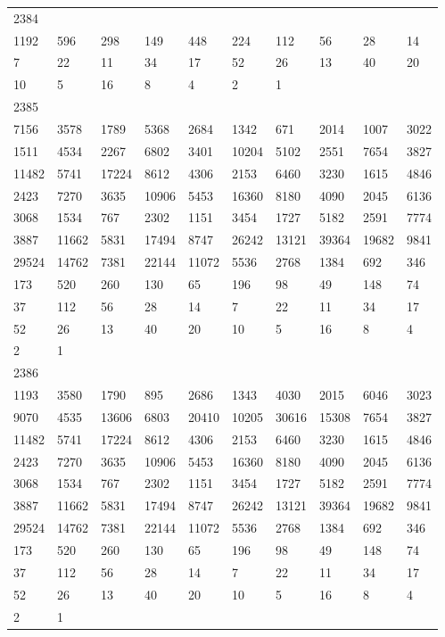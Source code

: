 \begin{longtable}{*{10}{l}}
2384&&&&&&&&&\\
1192& 596& 298& 149& 448& 224& 112& 56& 28& 14\\
7& 22& 11& 34& 17& 52& 26& 13& 40& 20\\
10& 5& 16& 8& 4& 2& 1& \\

2385&&&&&&&&&\\
7156& 3578& 1789& 5368& 2684& 1342& 671& 2014& 1007& 3022\\
1511& 4534& 2267& 6802& 3401& 10204& 5102& 2551& 7654& 3827\\
11482& 5741& 17224& 8612& 4306& 2153& 6460& 3230& 1615& 4846\\
2423& 7270& 3635& 10906& 5453& 16360& 8180& 4090& 2045& 6136\\
3068& 1534& 767& 2302& 1151& 3454& 1727& 5182& 2591& 7774\\
3887& 11662& 5831& 17494& 8747& 26242& 13121& 39364& 19682& 9841\\
29524& 14762& 7381& 22144& 11072& 5536& 2768& 1384& 692& 346\\
173& 520& 260& 130& 65& 196& 98& 49& 148& 74\\
37& 112& 56& 28& 14& 7& 22& 11& 34& 17\\
52& 26& 13& 40& 20& 10& 5& 16& 8& 4\\
2& 1& \\

2386&&&&&&&&&\\
1193& 3580& 1790& 895& 2686& 1343& 4030& 2015& 6046& 3023\\
9070& 4535& 13606& 6803& 20410& 10205& 30616& 15308& 7654& 3827\\
11482& 5741& 17224& 8612& 4306& 2153& 6460& 3230& 1615& 4846\\
2423& 7270& 3635& 10906& 5453& 16360& 8180& 4090& 2045& 6136\\
3068& 1534& 767& 2302& 1151& 3454& 1727& 5182& 2591& 7774\\
3887& 11662& 5831& 17494& 8747& 26242& 13121& 39364& 19682& 9841\\
29524& 14762& 7381& 22144& 11072& 5536& 2768& 1384& 692& 346\\
173& 520& 260& 130& 65& 196& 98& 49& 148& 74\\
37& 112& 56& 28& 14& 7& 22& 11& 34& 17\\
52& 26& 13& 40& 20& 10& 5& 16& 8& 4\\
2& 1& \\


\end{longtable}
